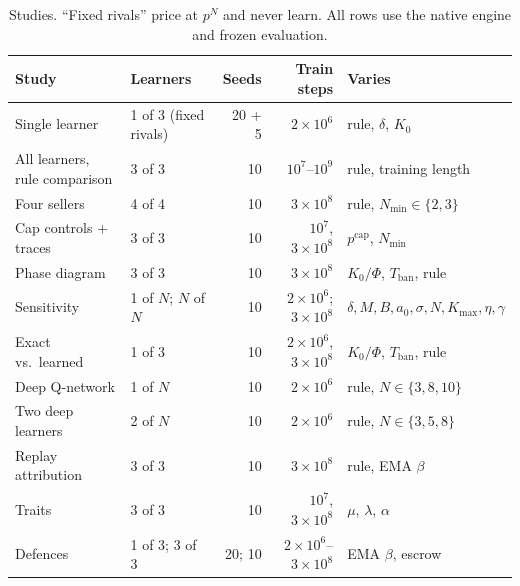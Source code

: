 \documentclass{article}
\newcommand{\Nmin}{N_{\min}}
\newcommand{\Tban}{T_{\mathrm{ban}}}
\begin{document}
\begin{table}[t]
\centering
\caption{Studies. ``Fixed rivals'' price at $p^N$ and never learn. All rows use the native engine and frozen evaluation.}
\label{tab:design}
\small
\begin{tabular}{@{}llrrl@{}}
\toprule
Study & Learners & Seeds & Train steps & Varies \\
\midrule
Single learner & 1 of 3 (fixed rivals) & 20 + 5 & $2\times10^6$ & rule, $\delta$, $K_0$ \\
All learners, rule comparison & 3 of 3 & 10 & $10^7$--$10^9$ & rule, training length \\
Four sellers & 4 of 4 & 10 & $3\times10^8$ & rule, $\Nmin\in\{2,3\}$ \\
Cap controls + traces & 3 of 3 & 10 & $10^7$, $3\times10^8$ & $p^{\mathrm{cap}}$, $\Nmin$ \\
Phase diagram & 3 of 3 & 10 & $3\times10^8$ & $K_0/\Phi$, $\Tban$, rule \\
Sensitivity & 1 of $N$; $N$ of $N$ & 10 & $2\times10^6$; $3\times10^8$ & $\delta,M,B,a_0,\sigma,N,K_{\max},\eta,\gamma$ \\
Exact vs.\ learned & 1 of 3 & 10 & $2\times10^6$, $3\times10^8$ & $K_0/\Phi$, $\Tban$, rule \\
Deep Q-network & 1 of $N$ & 10 & $2\times10^6$ & rule, $N\in\{3,8,10\}$ \\
Two deep learners & 2 of $N$ & 10 & $2\times10^6$ & rule, $N\in\{3,5,8\}$ \\
Replay attribution & 3 of 3 & 10 & $3\times10^8$ & rule, EMA $\beta$ \\
Traits & 3 of 3 & 10 & $10^7$, $3\times10^8$ & $\mu$, $\lambda$, $\alpha$ \\
Defences & 1 of 3; 3 of 3 & 20; 10 & $2\times10^6$--$3\times10^8$ & EMA $\beta$, escrow \\
\bottomrule
\end{tabular}
\end{table}
\end{document}
